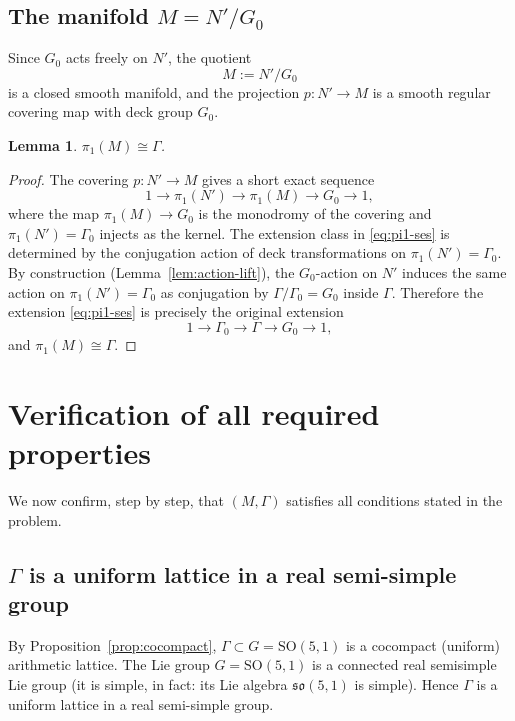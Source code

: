 \documentclass[12pt]{article}
\newtheorem{lemma}[theorem]{Lemma}
\theoremstyle{definition}
\theoremstyle{remark}
\begin{document}
\subsection{The manifold $M = N'/G_0$}
\label{sub:M}

Since $G_0$ acts freely on $N'$, the quotient
\begin{equation}
  \label{eq:M}
  M := N' / G_0
\end{equation}
is a closed smooth manifold, and the projection $p: N' \to M$ is a smooth regular
covering map with deck group $G_0$.

\begin{lemma}
\label{lem:pi1M}
$\pi_1(M) \cong \Gamma$.
\end{lemma}

\begin{proof}
The covering $p: N' \to M$ gives a short exact sequence
\begin{equation}
  \label{eq:pi1-ses}
  1 \longrightarrow \pi_1(N') \longrightarrow \pi_1(M) \longrightarrow G_0 \longrightarrow 1,
\end{equation}
where the map $\pi_1(M) \to G_0$ is the monodromy of the covering and
$\pi_1(N') = \Gamma_0$ injects as the kernel. The extension class in \eqref{eq:pi1-ses}
is determined by the conjugation action of deck transformations on $\pi_1(N') = \Gamma_0$.
By construction (Lemma~\ref{lem:action-lift}), the $G_0$-action on $N'$ induces the
same action on $\pi_1(N') = \Gamma_0$ as conjugation by $\Gamma/\Gamma_0 = G_0$ inside
$\Gamma$. Therefore the extension \eqref{eq:pi1-ses} is precisely the original extension
\[
  1 \longrightarrow \Gamma_0 \longrightarrow \Gamma \longrightarrow G_0 \longrightarrow 1,
\]
and $\pi_1(M) \cong \Gamma$.
\end{proof}

\section{Verification of all required properties}
\label{sec:verification}

We now confirm, step by step, that $(M, \Gamma)$ satisfies all conditions stated in
the problem.

\subsection{$\Gamma$ is a uniform lattice in a real semi-simple group}
\label{sub:verif-lattice}

By Proposition~\ref{prop:cocompact}, $\Gamma \subset G = \mathrm{SO}(5,1)$ is a
cocompact (uniform) arithmetic lattice. The Lie group $G = \mathrm{SO}(5,1)$ is a
connected real semisimple Lie group (it is simple, in fact: its Lie algebra
$\mathfrak{so}(5,1)$ is simple). Hence $\Gamma$ is a uniform lattice in a real
semi-simple group. \checkmark
\end{document}

